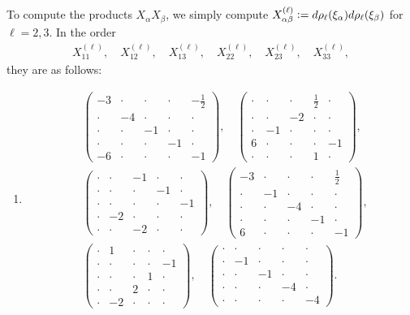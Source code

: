 \documentclass[a4paper,10pt,leqno]{article}
\numberwithin{equation}{section}
\theoremstyle{plain}
\theoremstyle{definition}
\theoremstyle{remark}
\newcommand{\mat}[1]{\begin{matrix}#1\end{matrix}}
\newcommand{\pmat}[1]{\left(\mat{#1}\right)}
\begin{document}
To compute the products $X_\alpha X_\beta$, we simply compute $X_{\alpha\beta}^{(\ell)} \vcentcolon= d\rho_\ell(\xi_\alpha) d\rho_\ell(\xi_\beta)$ for $\ell = 2, 3$.
In the order 
\begin{align} 
X_{11}^{(\ell)},\quad
X_{12}^{(\ell)},\quad
X_{13}^{(\ell)},\quad
X_{22}^{(\ell)},\quad
X_{23}^{(\ell)},\quad
X_{33}^{(\ell)},
\end{align} 
they are as follows:
\begin{enumerate} 
\item[$\ell = 2$:]
\begin{align}
&\pmat{-3&\cdot&\cdot&\cdot&-\frac12\\
		\cdot&-4&\cdot&\cdot&\cdot\\
		\cdot&\cdot&-1&\cdot&\cdot\\
		\cdot&\cdot&\cdot&-1&\cdot\\
		-6&\cdot&\cdot&\cdot&-1},\quad 
	\pmat{\cdot&\cdot&\cdot&\frac12&\cdot\\
		\cdot&\cdot&-2&\cdot&\cdot\\
		\cdot&-1&\cdot&\cdot&\cdot\\
		6&\cdot&\cdot&\cdot&-1\\
		\cdot&\cdot&\cdot&1&\cdot},\\[0.5ex]
&\pmat{\cdot&\cdot&-1&\cdot&\cdot\\
		\cdot&\cdot&\cdot&-1&\cdot\\
		\cdot&\cdot&\cdot&\cdot&-1\\
		\cdot&-2&\cdot&\cdot&\cdot\\
		\cdot&\cdot&-2&\cdot&\cdot},\quad
	\pmat{-3&\cdot&\cdot&\cdot&\frac12\\
		\cdot&-1&\cdot&\cdot&\cdot\\
		\cdot&\cdot&-4&\cdot&\cdot\\
		\cdot&\cdot&\cdot&-1&\cdot\\
		6&\cdot&\cdot&\cdot&-1},\\[0.5ex]
&\pmat{\cdot&1&\cdot&\cdot&\cdot\\
		\cdot&\cdot&\cdot&\cdot&-1\\
		\cdot&\cdot&\cdot&1&\cdot\\
		\cdot&\cdot&2&\cdot&\cdot\\
		\cdot&-2&\cdot&\cdot&\cdot},\quad
	\pmat{\cdot&\cdot&\cdot&\cdot&\cdot\\
		\cdot&-1&\cdot&\cdot&\cdot\\
		\cdot&\cdot&-1&\cdot&\cdot\\
		\cdot&\cdot&\cdot&-4&\cdot\\
		\cdot&\cdot&\cdot&\cdot&-4}.
\end{align}


\end{enumerate}
\end{document}
